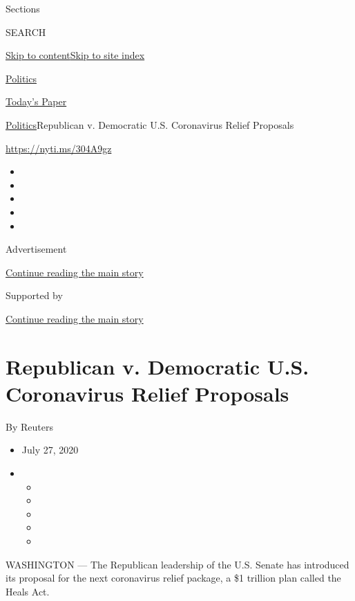 Sections

SEARCH

\protect\hyperlink{site-content}{Skip to
content}\protect\hyperlink{site-index}{Skip to site index}

\href{https://www.nytimes3xbfgragh.onion/section/politics}{Politics}

\href{https://myaccount.nytimes3xbfgragh.onion/auth/login?response_type=cookie\&client_id=vi}{}

\href{https://www.nytimes3xbfgragh.onion/section/todayspaper}{Today's
Paper}

\href{/section/politics}{Politics}\textbar{}Republican v. Democratic
U.S. Coronavirus Relief Proposals

\url{https://nyti.ms/304A9gz}

\begin{itemize}
\item
\item
\item
\item
\item
\end{itemize}

Advertisement

\protect\hyperlink{after-top}{Continue reading the main story}

Supported by

\protect\hyperlink{after-sponsor}{Continue reading the main story}

\hypertarget{republican-v-democratic-us-coronavirus-relief-proposals}{%
\section{Republican v. Democratic U.S. Coronavirus Relief
Proposals}\label{republican-v-democratic-us-coronavirus-relief-proposals}}

By Reuters

\begin{itemize}
\item
  July 27, 2020
\item
  \begin{itemize}
  \item
  \item
  \item
  \item
  \item
  \end{itemize}
\end{itemize}

WASHINGTON --- The Republican leadership of the U.S. Senate has
introduced its proposal for the next coronavirus relief package, a \$1
trillion plan called the Heals Act.

